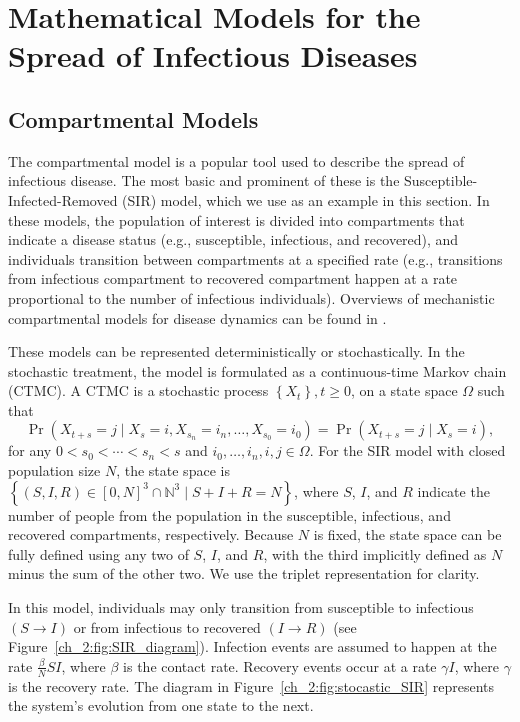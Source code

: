 \section{Mathematical Models for the Spread of Infectious Diseases}
\label{sec:math_models}

\subsection{Compartmental Models}
\label{ch_2:sec:compartmental_models}
The compartmental model is a popular tool used to describe the spread of infectious disease.
The most basic and prominent of these is the Susceptible-Infected-Removed (SIR) model, which we use as an example in this section.
In these models, the population of interest is divided into compartments that indicate a disease status (e.g., susceptible, infectious, and recovered), and individuals transition between compartments at a specified rate
(e.g., transitions from infectious compartment to recovered compartment happen at a rate proportional to the number of infectious individuals).
Overviews of mechanistic compartmental models for disease dynamics can be found in \citep{anderson1992infectious, Brauer2008, keeling2011modeling, 10.1093/aje/kww021}.

These models can be represented deterministically or stochastically.
In the stochastic treatment, the model is formulated as a continuous-time Markov chain (CTMC).
A CTMC is a stochastic process \( \left\{ X_t \right\}, t \geq 0 \), on a state space \( \Omega \) such that
\begin{equation}
    \Pr\left( X_{t + s} = j\mid X_s = i, X_{s_n} = i_n, \ldots, X_{s_0} = i_0 \right) = \Pr \left( X_{t+s} = j \mid X_s = i\right),
\end{equation}
for any \(0 <  s_0 < \cdots < s_n < s \) and \( i_0, \ldots, i_n, i, j \in \Omega \).
For the SIR model with closed population size \( N \), the state space is \( \left\{ (S, I, R) \in \left[ 0, N \right]^3 \cap \mathbb{N}^3 \mid S + I + R = N\right\} \), where \( S \), \( I \), and \( R \) indicate the number of people from the population in the susceptible, infectious, and recovered compartments, respectively.
Because \( N \) is fixed, the state space can be fully defined using any two of \( S \), \( I \), and \( R \), with the third implicitly defined as \( N \) minus the sum of the other two.
We use the triplet representation for clarity.

In this model, individuals may only transition from susceptible to infectious \( (S \to I) \) or from infectious to recovered \( (I \to R) \) (see Figure~\ref{ch_2:fig:SIR_diagram}).
Infection events are assumed to happen at the rate \( \frac{\beta}{N} S I \), where \( \beta \) is the contact rate.
Recovery events occur at a rate \( \gamma I \), where \( \gamma \) is the recovery rate.
The diagram in Figure~\ref{ch_2:fig:stocastic_SIR} represents the system's evolution from one state to the next.

